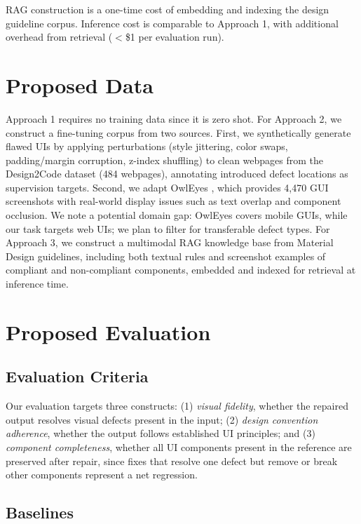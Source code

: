 \documentclass[11pt]{article}
\begin{document}
RAG construction is a one-time cost of embedding and indexing the design guideline corpus. Inference cost is comparable to Approach 1, with additional overhead from retrieval ($<$\$1 per evaluation run).

\section{Proposed Data}

Approach 1 requires no training data since it is zero shot. For Approach 2, we construct a fine-tuning corpus from two sources. First, we synthetically generate flawed UIs by applying perturbations (style jittering, color swaps, padding/margin corruption, z-index shuffling) to clean webpages from the Design2Code dataset (484 webpages), annotating introduced defect locations as supervision targets. Second, we adapt OwlEyes \cite{owleyes2021}, which provides 4,470 GUI screenshots with real-world display issues such as text overlap and component occlusion. We note a potential domain gap: OwlEyes covers mobile GUIs, while our task targets web UIs; we plan to filter for transferable defect types. For Approach 3, we construct a multimodal RAG knowledge base from Material Design guidelines, including both textual rules and screenshot examples of compliant and non-compliant components, embedded and indexed for retrieval at inference time.
\section{Proposed Evaluation}

\subsection{Evaluation Criteria}

Our evaluation targets three constructs: (1) \textit{visual fidelity}, whether the repaired output resolves visual defects present in the input; (2) \textit{design convention adherence}, whether the output follows established UI principles; and (3) \textit{component completeness}, whether all UI components present in the reference are preserved after repair, since fixes that resolve one defect but remove or break other components represent a net regression.

\subsection{Baselines}
\end{document}
